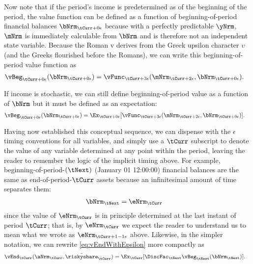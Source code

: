 \documentclass[./SolvingMicroDSOPs_TRP]{subfiles}
\begin{document}
Now note that if the period's income is predetermined as of the beginning of the period, the value function can be defined as a function of beginning-of-period financial balances $\bNrm_{\tCurr+\beginWithb}$ because with a perfectly predictable $\yNrm$, $\mNrm$ is immediately calculable from $\bNrm$ and is therefore not an independent state variable.  Because the Roman $\mathrm{v}$ derives from the Greek upsilon character $\upsilon$ (and the Greeks flourished before the Romans), we can write this beginning-of-period value function as
  \begin{align}
    \vBeg_{\tCurr+\beginWithb}(\bNrm_{\tCurr+\beginWithb}) & = \vFunc_{\tCurr+\choosecons}(\mNrm_{\tCurr+\calculatem},\bNrm_{\tCurr+\beginWithb}).
  \end{align}

  If income is stochastic, we can still define beginning-of-period value as a function of $\bNrm$ but it must be defined as an expectation:
  \begin{align}
    \vBeg_{\tCurr+\beginWithb}(\bNrm_{\tCurr+\beginWithb}) & = \Ex_{\tCurr+\beginWithb}[\vFunc_{\tCurr+\choosecons}(\mNrm_{\tCurr+\calculatem},\bNrm_{\tCurr+\beginWithb})].
  \end{align}

Having now established this conceptual sequence, we can dispense with the $\epsilon$ timing conventions for all variables, and simply use a $\tCurr$ subscript to denote the value of any variable determined at any point within the period, leaving the reader to remember the logic of the implicit timing above.  For example, beginning-of-period-$(\tNext)$ (January 01 12:00:00) financial balances are the same as end-of-period-$\tCurr$ assets because an infinitesimal amount of time separates them:
\begin{align}
 \bNrm_{\tNext} & = \eNrm_{\tCurr}
\end{align}
since the value of $\eNrm_{\tCurr}$ is in principle determined at the last instant of period $\tCurr$; that is, by $\eNrm_{\tCurr}$ we expect the reader to understand us to mean what we wrote as $\eNrm_{\tCurr+1-\calculatee}$ above.  Likewise, in the simpler notation, we can rewrite \eqref{eq:vEndWithEpsilon} more compactly as
\begin{align}
  \vEnd_{\tCurr}(\aNrm_{\tCurr},\Rend{\riskyshare}_{\tCurr}) & =  \Ex_{\tCurr}[\DiscFac_{\tNext} \vBeg_{\tNext}(\bNrm_{\tNext})] \label{eq:vEnd}.
\end{align}
\end{document}
